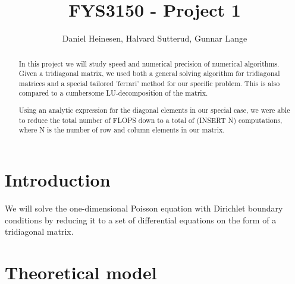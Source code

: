 \documentclass[a4paper, 10pt]{article}
\title{FYS3150 - Project 1}
\author{Daniel Heinesen, Halvard Sutterud, Gunnar Lange}
\begin{document}
\maketitle
\begin{abstract}

    In this project we will study speed and numerical precision of
    numerical algorithms. Given a tridiagonal matrix, we used both a
    general solving algorithm for tridiagonal matrices and a special
    tailored 'ferrari' method for our specific problem. This is also
    compared to a cumbersome LU-decomposition of the matrix.



    Using an analytic expression for the diagonal elements in our special
    case, we were able to reduce the total number of FLOPS down to a total
    of (INSERT N) computations, where N is the number of row and column
    elements in our matrix. 

    

\end{abstract}
\tableofcontents


\section*{Introduction }
    We will solve the one-dimensional Poisson equation with
    Dirichlet boundary conditions by reducing it to a set of differential
    equations on the form of a tridiagonal matrix. 

\section*{Theoretical model}
\end{document}

